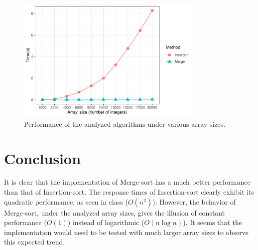\documentclass[11pt]{article}
\begin{document}
\inputminted[linenos]{python}{array_generator.py}
\label{cod:array}

\begin{figure}[t]
    \centering
    \includegraphics[width=0.8\textwidth]{figure}
    \caption{Performance of the analyzed algorithms under various array sizes.}
    \label{fig:sort}
\end{figure}

\section{Conclusion}
It is clear that the implementation of Merge-sort has a much better performance than that of Insertion-sort. The response times of Insertion-sort clearly exhibit its quadratic performance, as seen in class ($O(n^2)$). However, the behavior of Merge-sort, under the analyzed array sizes, gives the illusion of constant performance ($O(1)$) instead of logarithmic ($O(n \log n)$). It seems that the implementation would need to be tested with much larger array sizes to observe this expected trend.
\end{document}
